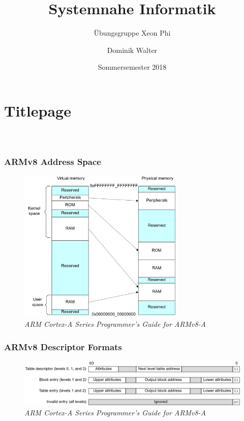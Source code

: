 \documentclass[xcolor=pdftex,dvipsnames,table]{beamer}
\title{Systemnahe Informatik}
\subtitle{Übungsgruppe Xeon Phi}
\author{Dominik Walter}
\date{Sommersemester 2018}
\begin{document}
\section*{Titlepage}
\begin{frame}
  \frametitle{\ }
  \titlepage

\end{frame}

\begin{frame}
\frametitle{ARMv8 Address Space}
\begin{figure}[htbp]
	\centering
	\includegraphics[width=0.7\textwidth]{virtual_physical_memory}
	\caption {\textit{ARM Cortex-A Series Programmer’s Guide for ARMv8-A}}
\end{figure}
\end{frame}

\begin{frame}
	\frametitle{ARMv8 Descriptor Formats}
	\begin{figure}[htbp]
		\centering
		\includegraphics[width=1\textwidth]{VAtable}
		\caption {\textit{ARM Cortex-A Series Programmer’s Guide for ARMv8-A}}
	\end{figure}
\end{frame}
\end{document}
